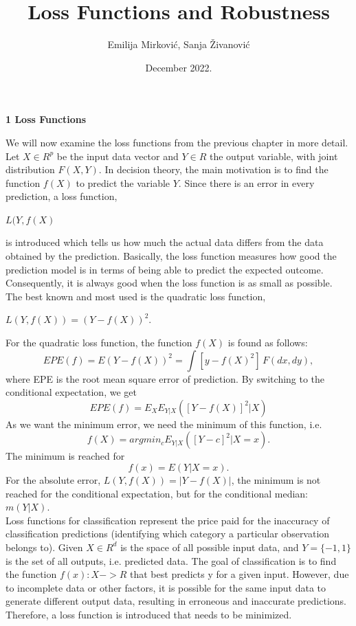 \documentclass[12pt, letterpaper, twoside]{article}
\title{ %
    Loss Functions and Robustness
    \\ }
\author{Emilija Mirković, Sanja Živanović}
\date{December 2022.}
\begin{document}
\maketitle
\begin{center}
\textbf{\large{1 Loss Functions}} 

\end{center}
We will now examine the loss functions from the previous chapter in more detail.\\
Let $X \in R^{p}$ be the input data vector and $Y \in R$ the output variable, with joint distribution $F(X,Y)$. In decision theory, the main motivation is to find the function $f(X)$ to predict the variable $Y$. Since there is an error in every prediction, a loss function,
\begin{center}
 $L(Y,f(X)$
\end{center} is introduced which tells us how much the actual data differs from the data obtained by the prediction. Basically, the loss function measures how good the prediction model is in terms of being able to predict the expected outcome. Consequently, it is always good when the loss function is as small as possible.\\
\hspace*{4ex}The best known and most used is the quadratic loss function, 
\begin{center}
$L(Y,f(X)) = (Y - f(X))^2$. 
\end{center}
For the quadratic loss function, the function $f(X)$ is found as follows:\[EPE(f) = E(Y-f(X))^2 = \int [y-f(X)^2] \,F(dx,dy),\]
where EPE is the root mean square error of prediction.
By switching to the conditional expectation, we get \[EPE(f) = E_XE_{Y|X}([Y-f(X)]^2|X)\]
As we want the minimum error, we need the minimum of this function, i.e. \[f(X)=argmin_cE_{Y|X}([Y-c]^2|X=x).\]
The minimum is reached for \[f(x)= E(Y|X=x).\]
For the absolute error, \(L(Y,f(X)) = |Y-f(X)|\), the minimum is not reached for the conditional expectation, but for the conditional median: \(m(Y|X)\).\\
\hspace*{4ex} Loss functions for classification represent the price paid for the inaccuracy of classification predictions (identifying which category a particular observation belongs to). Given $X \in R^d$ is the space of all possible input data, and $Y = \{−1, 1\}$ is the set of all outputs, i.e. predicted data. The goal of classification is to find the function $f(x) : X -> R$ that best predicts y for a given input. However, due to incomplete data or other factors, it is possible for the same input data to generate different output data, resulting in erroneous and inaccurate predictions. Therefore, a loss function is introduced that needs to be minimized.\\
\end{document}
